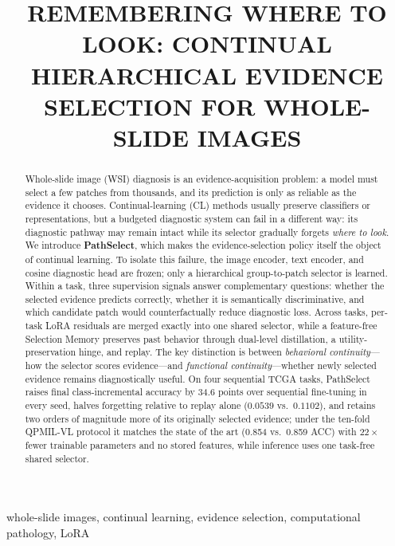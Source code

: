 \documentclass{article}
\title{REMEMBERING WHERE TO LOOK: CONTINUAL HIERARCHICAL EVIDENCE SELECTION FOR WHOLE-SLIDE IMAGES}
\begin{document}
\ninept
\maketitle

\begin{abstract}
Whole-slide image (WSI) diagnosis is an evidence-acquisition problem: a model must select a few patches from thousands, and its prediction is only as reliable as the evidence it chooses.
Continual-learning (CL) methods usually preserve classifiers or representations, but a budgeted diagnostic system can fail in a different way: its diagnostic pathway may remain intact while its selector gradually forgets \emph{where to look}.
We introduce \textbf{PathSelect}, which makes the evidence-selection policy itself the object of continual learning.
To isolate this failure, the image encoder, text encoder, and cosine diagnostic head are frozen; only a hierarchical group-to-patch selector is learned.
Within a task, three supervision signals answer complementary questions: whether the selected evidence predicts correctly, whether it is semantically discriminative, and which candidate patch would counterfactually reduce diagnostic loss.
Across tasks, per-task LoRA residuals are merged exactly into one shared selector, while a feature-free Selection Memory preserves past behavior through dual-level distillation, a utility-preservation hinge, and replay.
The key distinction is between \emph{behavioral continuity}---how the selector scores evidence---and \emph{functional continuity}---whether newly selected evidence remains diagnostically useful.
On four sequential TCGA tasks, PathSelect raises final class-incremental accuracy by 34.6 points over sequential fine-tuning in every seed, halves forgetting relative to replay alone ($0.0539$ vs.\ $0.1102$), and retains two orders of magnitude more of its originally selected evidence; under the ten-fold QPMIL-VL protocol it matches the state of the art (0.854 vs.\ 0.859 ACC) with $22\times$ fewer trainable parameters and no stored features, while inference uses one task-free shared selector.
\end{abstract}

\begin{keywords}
whole-slide images, continual learning, evidence selection, computational pathology, LoRA
\end{keywords}

\end{document}
